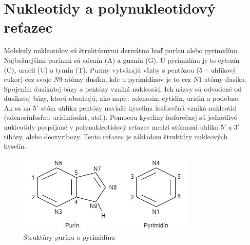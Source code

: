 \section{Nukleotidy a polynukleotidový reťazec}
Molekuly nukleotidov sú štruktúrnymi derivátmi buď purínu alebo pyrimidínu. Najbežnejšími purínmi sú adenín (A) a guanín (G). U pyrimidínu je to cytozín (C), uracil (U) a tymín (T). Puríny vytvárajú väzby s pentózou ($5-$uhlíkový cukor) cez svoje $N9$ atómy dusíku, kde u pyrimidínov je to cez $N1$ atómy dusíku. Spojením dusíkatej bázy a pentózy vzniká nukleosid. Ich názvy sú odvodené od dusíkatej bázy, ktorú obsahujú, ako napr.: adenosin, cytidin, uridin a podobne. Ak sa na $5'$ atóm uhlíku pentózy naviaže kyselina fosforečná vzniká nukleotid (adenosinfosfat, uridinfosfat, atď.). Pomocou kyseliny fosforečnej sú jednotlivé nukleotidy pospájané v polynukleotidový reťazec medzi atómami uhlíka $5'$ a $3'$ ribózy, alebo deoxyribozy. Tento reťazec je základom štruktúry nukleových kyselín.
\begin{figure}[!ht]
\centering
\includegraphics[scale =0.8]{obrazky-figures/purin.png}
\caption{Štruktúry purínu a pyrimidínu}
\end{figure}
